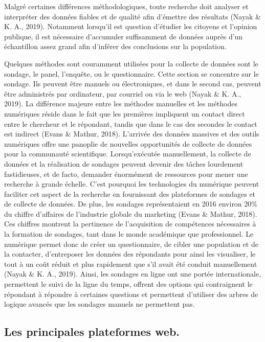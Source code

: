 \documentclass[
  letterpaper,
]{scrbook}
\begin{document}
Malgré certaines différences méthodologiques, toute recherche doit
analyser et interpréter des données fiables et de qualité afin d'émettre
des résultats (Nayak \& K. A., 2019). Notamment lorsqu'il est question
d'étudier les citoyens et l'opinion publique, il est nécessaire
d'accumuler suffisamment de données auprès d'un échantillon assez grand
afin d'inférer des conclusions sur la population.

\hfill\break
Quelques méthodes sont couramment utilisées pour la collecte de données
sont le sondage, le panel, l'enquête, ou le questionnaire. Cette section
se concentre sur le sondage. Ils peuvent être manuels ou électroniques,
et dans le second cas, peuvent être administrés par ordinateur, par
courriel ou via le web (Nayak \& K. A., 2019). La différence majeure
entre les méthodes manuelles et les méthodes numériques réside dans le
fait que les premières impliquent un contact direct entre le chercheur
et le répondant, tandis que dans le cas des secondes le contact est
indirect (Evans \& Mathur, 2018). L'arrivée des données massives et des
outils numériques offre une panoplie de nouvelles opportunités de
collecte de données pour la communauté scientifique. Lorsqu'exécutée
manuellement, la collecte de données et la réalisation de sondages
peuvent devenir des tâches lourdement fastidieuses, et de facto,
demander énormément de ressources pour mener une recherche à grande
échelle. C'est pourquoi les technologies du numérique peuvent faciliter
cet aspect de la recherche en fournissant des plateformes de sondages et
de collecte de données. De plus, les sondages représentaient en 2016
environ 20\% du chiffre d'affaires de l'industrie globale du marketing
(Evans \& Mathur, 2018). Ces chiffres montrent la pertinence de
l'acquisition de compétences nécessaires à la formation de sondages,
tant dans le monde académique que professionnel. Le numérique permet
donc de créer un questionnaire, de cibler une population et de la
contacter, d'entreposer les données des répondants pour ainsi les
visualiser, le tout à un coût réduit et plus rapidement que s'il avait
été conduit manuellement (Nayak \& K. A., 2019). Ainsi, les sondages en
ligne ont une portée internationale, permettent le suivi de la ligne du
temps, offrent des options qui contraignent le répondant à répondre à
certaines questions et permettent d'utiliser des arbres de logique
avancés que les sondages manuels ne permettent pas.

\hypertarget{les-principales-plateformes-web.}{%
\subsection{Les principales plateformes
web.}\label{les-principales-plateformes-web.}}
\end{document}

